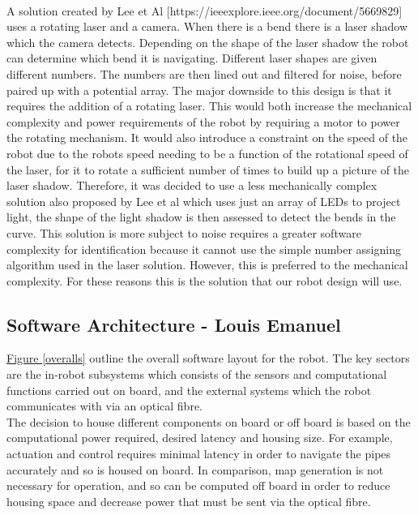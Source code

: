 \documentclass[11pt]{article}		%
\newcommand{\figref}[1]{\hyperref[#1]{Figure \ref*{#1}}}    %
\begin{document}
	        \\
	        A solution created by Lee et Al [https://ieeexplore.ieee.org/document/5669829] uses a rotating laser and a camera. 
	        When there is a bend there is a laser shadow which the camera detects. 
	        Depending on the shape of the laser shadow the robot can determine which bend it is navigating. 
	       	Different laser shapes are given different numbers. 
	       	The numbers are then lined out and filtered for noise, before paired up with a potential array. 
	       	The major downside to this design is that it requires the addition of a rotating laser. 
	       	This would both increase the mechanical complexity and power requirements of the robot by requiring a motor to power the rotating mechanism. 
	       	It would also introduce a constraint on the speed of the robot due to the robots speed needing to be a function of the rotational speed of the laser, for it to rotate a sufficient number of times to build up a picture of the laser shadow. 
	       	Therefore, it was decided to use a less mechanically complex solution also proposed by Lee et al which uses just an array of LEDs to project light, the shape of the light shadow is then assessed to detect the bends in the curve. 
	       	This solution is more subject to noise requires a greater software complexity for identification because it cannot use the simple number assigning algorithm used in the laser solution. 
	       	However, this is preferred to the mechanical complexity. 
	       	For these reasons this is the solution that our robot design will use.
        
        \subsection[Software Architecture] {Software Architecture - Louis Emanuel}
        
	         \figref{overalls} outline the overall software layout for the robot. The key sectors are the in-robot subsystems which consists of the sensors and computational functions carried out on board, and the external systems which the robot communicates with via an optical fibre. \\
	
	         \hspace*{3ex}The decision to house different components on board or off board is based on the computational power required, desired latency and housing size. For example, actuation and control requires minimal latency in order to navigate the pipes accurately and so is housed on board. In comparison, map generation is not necessary for operation, and so can be computed off board in order to reduce housing space and decrease power that must be sent via the optical fibre. \\
	
\end{document}
